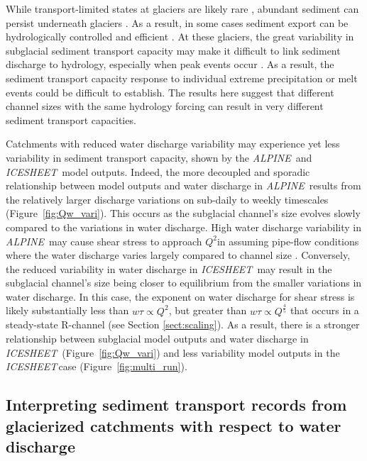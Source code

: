 \documentclass[esurf, manuscript]{copernicus}
\newcommand{\alpine}{\textit{ALPINE}\,}
\newcommand{\icesheet}{\textit{ICESHEET}\,}
\begin{document}
While transport-limited states at glaciers are likely rare \citep[e.g.][]{alley1997}, abundant sediment can persist underneath glaciers \citep[e.g.][]{walter2014,stevens2022,delaney2022}.
As a result, in some cases sediment export can be hydrologically controlled and efficient \citep[e.g.][]{swift2005,andresen2024}.
At these glaciers, the great variability in subglacial sediment transport capacity may make it difficult to link sediment discharge to hydrology, especially when peak events occur \citep{cowan1988,delaney2018,lu2022}.
As a result, the sediment transport capacity response to individual extreme precipitation or melt events could be difficult to establish.
The results here suggest that different channel sizes with the same hydrology forcing can result in very different sediment transport capacities. 

Catchments with reduced water discharge variability may experience yet less variability in sediment transport capacity, shown by the \alpine{} and \icesheet{} model outputs.
Indeed, the more decoupled and sporadic relationship between model outputs and water discharge in \alpine{} results from the relatively larger discharge variations on sub-daily to weekly timescales (Figure~\ref{fig:Qw_vari}).
This occurs as the subglacial channel's size evolves slowly compared to the variations in water discharge.
High water discharge variability in \alpine{} may cause shear stress to approach $Q^{2}$in assuming pipe-flow conditions where the water discharge varies largely compared to channel size \citep[Section \ref{sect:scaling}; c.f.][]{alley1997}.
Conversely, the reduced variability in water discharge in \icesheet{} may result in the subglacial channel's size being closer to equilibrium from the smaller variations in water discharge.
In this case, the exponent on water discharge for shear stress is likely substantially less than $w\tau \propto Q^2$, but greater than $w \tau \propto Q^{\frac{4}{5}}$ that occurs in a steady-state R-channel (see Section \ref{sect:scaling}).
As a result, there is a stronger relationship between subglacial model outputs and water discharge in \icesheet{} (Figure~\ref{fig:Qw_vari}) and less variability model outputs in the \icesheet case (Figure~\ref{fig:multi_run}).

\subsection{Interpreting sediment transport records from glacierized catchments with respect to water discharge}
\end{document}
